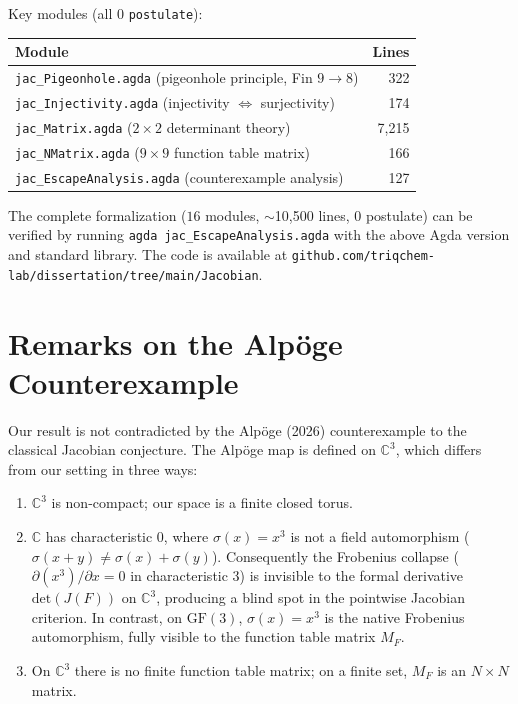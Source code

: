 \documentclass[a4paper,11pt]{article}
\theoremstyle{definition}
\theoremstyle{remark}
\newcommand{\GF}{\mathrm{GF}}
\newcommand{\C}{\mathbb{C}}
\newcommand{\MF}{M_F}
\newcommand{\Det}{\mathrm{det}}
\newcommand{\Jac}{J(F)}
\newcommand{\Frob}{\sigma}
\begin{document}
Key modules (all $0$ \texttt{postulate}):

\begin{center}
\begin{tabular}{l r}
\hline
Module & Lines \\
\hline
\texttt{jac\_Pigeonhole.agda} (pigeonhole principle, Fin $9\to8$) & 322 \\
\texttt{jac\_Injectivity.agda} (injectivity $\iff$ surjectivity) & 174 \\
\texttt{jac\_Matrix.agda} ($2\times2$ determinant theory) & 7,215 \\
\texttt{jac\_NMatrix.agda} ($9\times9$ function table matrix) & 166 \\
\texttt{jac\_EscapeAnalysis.agda} (counterexample analysis) & 127 \\
\hline
\end{tabular}
\end{center}

The complete formalization ($16$ modules, $\sim$10,500 lines, $0$ postulate)
can be verified by running \texttt{agda jac\_EscapeAnalysis.agda} with the
above Agda version and standard library.
The code is available at
\texttt{github.com/triqchem-lab/dissertation/tree/main/Jacobian}.

\section{Remarks on the Alp\"{o}ge Counterexample}

Our result is not contradicted by the Alp\"{o}ge (2026) counterexample to
the classical Jacobian conjecture. The Alp\"{o}ge map is defined on $\C^3$,
which differs from our setting in three ways:

\begin{enumerate}
\item $\C^3$ is non-compact; our space is a finite closed torus.
\item $\C$ has characteristic $0$, where $\Frob(x)=x^3$ is not a field
automorphism ($\Frob(x+y)\neq\Frob(x)+\Frob(y)$). Consequently the
Frobenius collapse ($\partial(x^3)/\partial x=0$ in characteristic $3$) is
invisible to the formal derivative $\Det(\Jac)$ on $\C^3$, producing a
blind spot in the pointwise Jacobian criterion. In contrast, on $\GF(3)$,
$\Frob(x)=x^3$ is the native Frobenius automorphism, fully visible to
the function table matrix $\MF$.
\item On $\C^3$ there is no finite function table matrix; on a finite set,
$\MF$ is an $N\times N$ matrix.
\end{enumerate}
\end{document}
